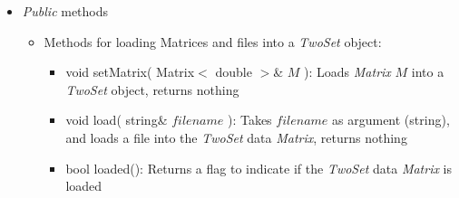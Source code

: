 \documentclass{report}
\begin{document}
\begin{itemize}

\item {\em Public} methods

\begin{itemize}

The constructor TwoSet( Matrix$<$ double $>$\& $M$ ) constructs and
loads {\em Matrix} $M$ into a {\em TwoSet} object

\item Methods for loading Matrices and files into a {\em TwoSet}
      object:
\begin{itemize}
\item void setMatrix( Matrix$<$ double $>$\& $M$ ): Loads {\em Matrix}
      $M$ into a {\em TwoSet} object, returns nothing
\item void load( string\& $filename$ ): Takes $filename$ as argument
      (string), and loads a file into the {\em TwoSet} data {\em
      Matrix}, returns nothing
\item bool loaded(): Returns a flag to indicate if the {\em TwoSet}
      data {\em Matrix} is loaded
\end{itemize}


\end{itemize}
\end{itemize}
\end{document}
